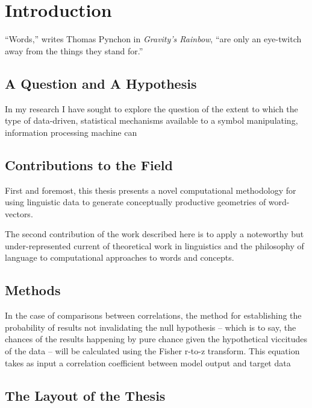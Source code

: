 \chapter{Introduction}
``Words,'' writes Thomas Pynchon in \emph{Gravity's Rainbow}, ``are only an eye-twitch away from the things they stand for.''

\section{A Question and A Hypothesis}
In my research I have sought to explore the question of the extent to which the type of data-driven, statistical mechanisms available to a symbol manipulating, information processing machine can 

\section{Contributions to the Field}
First and foremost, this thesis presents a novel computational methodology for using linguistic data to generate conceptually productive geometries of word-vectors.

The second contribution of the work described here is to apply a noteworthy but under-represented current of theoretical work in linguistics and the philosophy of language to computational approaches to words and concepts.

\section{Methods}
In the case of comparisons between correlations, the method for establishing the probability of results not invalidating the null hypothesis -- which is to say, the chances of the results happening by pure chance given the hypothetical viccitudes of the data -- will be calculated using the Fisher r-to-z transform.  This equation takes as input a correlation coefficient between model output and target data

\section{The Layout of the Thesis}
